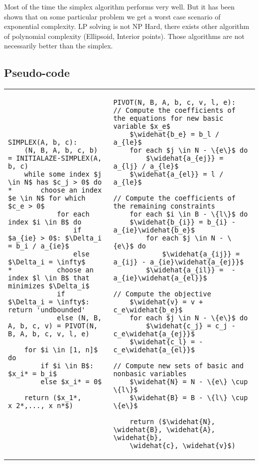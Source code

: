 Most of the time the simplex algorithm performs very well. But it has
been shown that on some particular problem we get a worst case scenario
of exponential complexity. LP solving is not NP Hard, there exists other
algorithm of polynomial complexity (Ellipsoid, Interior points). Those
algorithms are not necessarily better than the simplex.

\subsection{Pseudo-code}
\begin{tiny}
\begin{tabular}{m{8cm}m{8cm}}
    \begin{lstlisting}[mathescape]
SIMPLEX(A, b, c):
    (N, B, A, b, c, b) = INITIALAZE-SIMPLEX(A, b, c)
    while some index $j \in N$ has $c_j > 0$ do
*       choose an index $e \in N$ for which $c_e > 0$
            for each index $i \in B$ do
                if $a_{ie} > 0$: $\Delta_i = b_i / a_{ie}$
                else $\Delta_i = \infty$
*           choose an index $l \in B$ that minimizes $\Delta_i$
            if $\Delta_i = \infty$: return 'undbounded'
            else (N, B, A, b, c, v) = PIVOT(N, B, A, b, c, v, l, e)

    for $i \in [1, n]$ do 
        if $i \in B$: $x_i* = b_i$
        else $x_i* = 0$

    return ($x_1*, x_2*,..., x_n*$)
    \end{lstlisting}
    &
    \begin{lstlisting}[mathescape]
PIVOT(N, B, A, b, c, v, l, e):
// Compute the coefficients of the equations for new basic variable $x_e$
    $\widehat{b_e} = b_l / a_{le}$
    for each $j \in N - \{e\}$ do
        $\widehat{a_{ej}} = a_{lj} / a_{le}$
    $\widehat{a_{el}} = l / a_{le}$

// Compute the coefficients of the remaining constraints
    for each $i \in B - \{l\}$ do
    $\widehat{b_{i}} = b_{i} - a_{ie}\widehat{b_e}$
        for each $j \in N - \{e\}$ do
            $\widehat{a_{ij}} = a_{ij} - a_{ie}\widehat{a_{ej}}$
        $\widehat{a_{il}} =  - a_{ie}\widehat{a_{el}}$

// Compute the objective
    $\widehat{v} = v + c_e\widehat{b_e}$
    for each $j \in N - \{e\}$ do
        $\widehat{c_j} = c_j - c_e\widehat{a_{ej}}$
    $\widehat{c_l} = - c_e\widehat{a_{el}}$

// Compute new sets of basic and nonbasic variables
    $\widehat{N} = N - \{e\} \cup \{l\}$
    $\widehat{B} = B - \{l\} \cup \{e\}$

    return ($\widehat{N}, \widehat{B}, \widehat{A}, \widehat{b},
    \widehat{c}, \widehat{v}$)
    \end{lstlisting}
\end{tabular}
\end{tiny}


